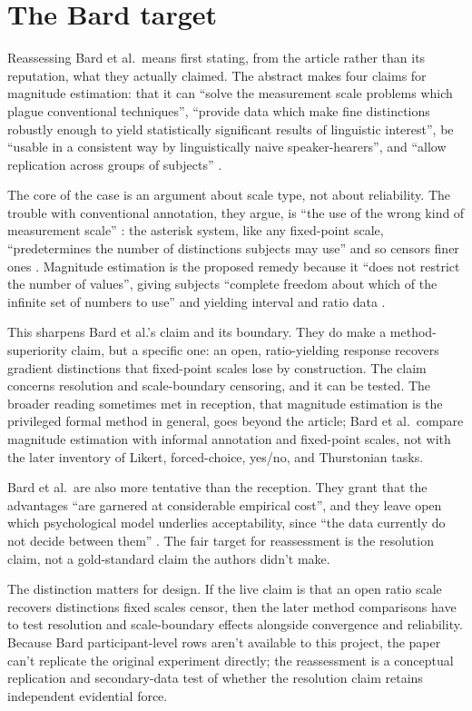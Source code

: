 \section{The Bard target}

Reassessing Bard et al.\ means first stating, from the article rather than its
reputation, what they actually claimed. The abstract makes four claims for
magnitude estimation: that it can \enquote{solve the measurement scale problems
which plague conventional techniques}, \enquote{provide data which make fine
distinctions robustly enough to yield statistically significant results of
linguistic interest}, be \enquote{usable in a consistent way by linguistically
naive speaker-hearers}, and \enquote{allow replication across groups of
subjects} \citep[32]{BardEtAl1996}.

The core of the case is an argument about scale type, not about reliability.
The trouble with conventional annotation, they argue, is \enquote{the use of the
wrong kind of measurement scale} \citep[32]{BardEtAl1996}: the asterisk
system, like any fixed-point scale, \enquote{predetermines the number of
distinctions subjects may use} and so censors finer ones
\citep[35]{BardEtAl1996}. Magnitude estimation is the proposed remedy
because it \enquote{does not restrict the number of values}, giving subjects
\enquote{complete freedom about which of the infinite set of numbers to use} and
yielding interval and ratio data \citep[41]{BardEtAl1996}.

This sharpens Bard et al.'s claim and its boundary. They do make a
method-superiority claim, but a specific one: an open, ratio-yielding response
recovers gradient distinctions that fixed-point scales lose by construction.
The claim concerns resolution and scale-boundary censoring, and it can be
tested. The broader reading sometimes met in reception, that magnitude
estimation is the privileged formal method in general, goes beyond the article;
Bard et al.\ compare magnitude estimation with informal annotation and
fixed-point scales, not with the later inventory of Likert, forced-choice,
yes/no, and Thurstonian tasks.

Bard et al.\ are also more tentative than the reception. They grant that the
advantages \enquote{are garnered at considerable empirical cost}, and they leave
open which psychological model underlies acceptability, since \enquote{the data
currently do not decide between them} \citep[65]{BardEtAl1996}. The fair
target for reassessment is the resolution claim, not a gold-standard claim the
authors didn't make.

The distinction matters for design. If the live claim is that an open ratio
scale recovers distinctions fixed scales censor, then the later method
comparisons have to test resolution and scale-boundary effects alongside
convergence and reliability. Because Bard participant-level rows aren't
available to this project, the paper can't replicate the original experiment
directly; the reassessment is a conceptual replication and secondary-data test
of whether the resolution claim retains independent evidential force.
